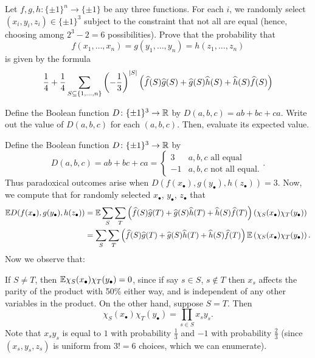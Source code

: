 \begin{problem}
	\onechili
	\label{prob:arrow_lemma}
	Let $f,g,h \colon \{\pm1\}^n \to \{\pm1\}$
	be any three functions.
	For each $i$, we randomly select $(x_i, y_i, z_i) \in \{\pm1\}^3$
	subject to the constraint that not all are equal
	(hence, choosing among $2^3-2=6$ possibilities).
	Prove that the probability that
	\[ f(x_1, \dots, x_n) = g(y_1, \dots, y_n) = h(z_1, \dots, z_n) \]
	is given by the formula
	\[ \frac14 + \frac14 \sum_{S \subseteq \{1, \dots, n\}}
		\left( -\frac13 \right)^{\left\lvert S \right\rvert}
		\left( \widehat f(S) \widehat g(S) + \widehat g(S) \widehat h(S) + \widehat h(S) \widehat f(S) \right)
		\]
	\begin{hint}
		Define the Boolean function $D \colon \{\pm 1\}^3 \to \mathbb R$ by
		$D(a,b,c) = ab+bc+ca$.
		Write out the value of $D(a,b,c)$ for each $(a,b,c)$.
		Then, evaluate its expected value.
	\end{hint}
	\begin{sol}
	Define the Boolean function $D \colon \{\pm 1\}^3 \to \mathbb R$ by
	\[ D(a,b,c) = ab + bc + ca
		= \begin{cases}
			3 & a,b,c \text{ all equal} \\
			-1 & a,b,c \text{ not all equal}.
		\end{cases}.
	\]
	Thus paradoxical outcomes arise when
	$D(f(x_\bullet), g(y_\bullet), h(z_\bullet)) = 3$.
	Now, we compute that for randomly selected
	$x_\bullet$, $y_\bullet$, $z_\bullet$ that
	\begin{align*}
		\mathbb E D(f(x_\bullet), g(y_\bullet), h(z_\bullet))
		&= \mathbb E \sum_S \sum_T
			\left( \widehat f(S) \widehat g(T) + \widehat g(S) \widehat h(T) + \widehat h(S) \widehat f(T) \right)
			\left( \chi_S(x_\bullet)\chi_T(y_\bullet) \right) \\
		&= \sum_S \sum_T
			\left( \widehat f(S) \widehat g(T) + \widehat g(S) \widehat h(T) + \widehat h(S) \widehat f(T) \right)
			\mathbb E\left( \chi_S(x_\bullet)\chi_T(y_\bullet) \right).
	\end{align*}
	Now we observe that:
	\begin{itemize}
		\ii If $S \neq T$, then $\mathbb E \chi_S(x_\bullet) \chi_T(y_\bullet) = 0$,
		since if say $s \in S$, $s \notin T$ then $x_s$ affects
		the parity of the product with 50\% either way,
		and is independent of any other variables in the product.
		\ii On the other hand, suppose $S = T$.
		Then
		\[ \chi_S(x_\bullet) \chi_T(y_\bullet)
			= \prod_{s \in S} x_sy_s. \]
		Note that $x_sy_s$ is equal to $1$ with probability $\frac13$
		and $-1$ with probability $\frac23$
		(since $(x_s, y_s, z_s)$ is uniform from $3!=6$ choices,
		which we can enumerate).

\end{itemize}
\end{sol}
\end{problem}
